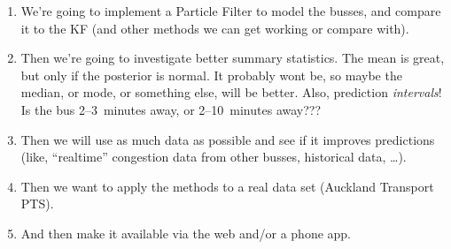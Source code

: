 \documentclass[12pt,a4paper]{article}
\begin{document}


















\begin{enumerate}
\item 
  We're going to implement a Particle Filter to model the busses,
  and compare it to the KF (and other methods we can get working or compare with).


\item 
  Then we're going to investigate better summary statistics.
  The mean is great, but only if the posterior is normal.
  It probably wont be, so maybe the median, or mode, or something else, will be better.
  Also, prediction \emph{intervals}! Is the bus 2--3~minutes away, or 2--10~minutes away???

\item 
  Then we will use as much data as possible and see if it improves predictions 
  (like, ``realtime'' congestion data from other busses, historical data, \ldots).

\item 
  Then we want to apply the methods to a real data set (Auckland Transport PTS).

\item 
  And then make it available via the web and/or a phone app.

\end{enumerate}
\end{document}
